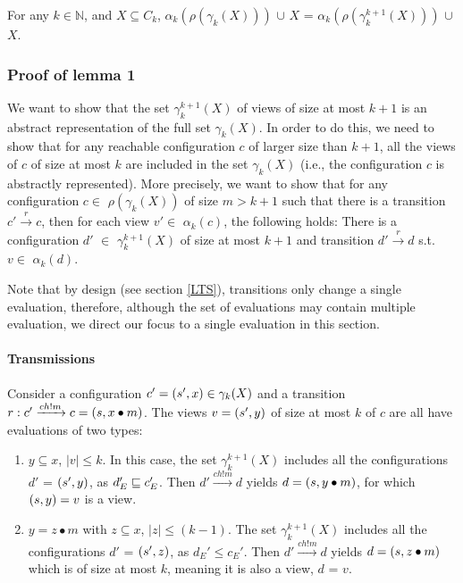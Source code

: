 \begin{lemma}
\label{lemma1}
For any $k\in\mathbb{N}$, and $X\subseteq C_k$, $\alpha_k(\rho(\gamma_k(X)))$ $\cup$ $X$ = $\alpha_k(\rho(\gamma_k^{k+1}(X)))$ $\cup$ $X$.
\end{lemma}

\subsubsection{Proof of lemma 1}
We want to show that the set $\gamma_k^{k+1}(X)$ of views of size at most $k+1$ is an abstract representation of the full set $\gamma_k(X)$. In order to do this, we need to show that for any reachable configuration $c$ of larger size than $k+1$, all the views of $c$ of size at most $k$ are included in the set $\gamma_k(X)$ (i.e., the configuration $c$ is abstractly represented). More precisely, we want to show that for any configuration $c \in$ $\rho(\gamma_k(X))$ of size $m > k + 1$ such that there is a transition  $c' \xrightarrow{r} c$, then for each view $v' \in$ $\alpha_k(c)$, the following holds: There is a configuration $d'$ $\in$ $\gamma_k^{k+1}(X)$ of size at most $k+1$ and transition $ d' \xrightarrow{r} d$ s.t. $v \in$ $\alpha_k(d)$.

Note that by design (see section \ref{LTS}), transitions only change a single evaluation, therefore, although the set of evaluations may contain multiple evaluation, we direct our focus to a single evaluation in this section.

\paragraph{Transmissions}
\label{proofTransmission}
Consider a configuration $c' = (s', x) \in \gamma_k(X)$ and a transition $r: c' \xrightarrow{ch!m} c = (s,x \bullet m)$. The views $v = (s', y)$ of size at most $k$ of $c$ are all have evaluations of two types:

\begin{enumerate}
\item
$y \subseteq x$, $|v| \leq k$. In this case, the set $\gamma_k^{k+1}(X)$ includes all the configurations $d'$ = $(s', y)$, as $d_E' \sqsubseteq c_E'$. Then $d' \xrightarrow{ch!m} d$ yields $d = (s, y\bullet m)$, for which $(s, y) = v$ is a view.
\item
$y = z\bullet m$ with $z \subseteq x$, $|z| \leq (k-1)$. The set $\gamma_k^{k+1}(X)$ includes all the configurations $d'$ = $(s', z)$, as $d_E' \leq c_E'$. Then $d' \xrightarrow{ch!m} d$ yields $d = (s, z\bullet m)$ which is of size at most $k$, meaning it is also a view, $d$ = $v$.
\end{enumerate}


